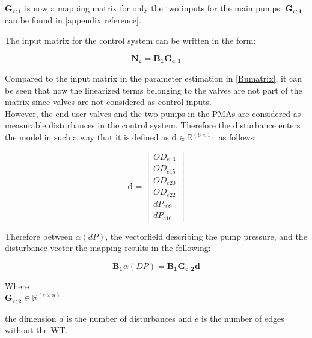 $\pmb{G_{c;1}}$ is now a mapping matrix for only the two inputs for the main pumps. $\pmb{G_{c;1}}$ can be found in [appendix reference].

The input matrix for the control system can be written in the form: 

\begin{equation}
  \pmb{N_c} =  \pmb{B_1}\pmb{G_{c;1}}  
\label{inputmatrix_control}	
\end{equation}

Compared to the input matrix in the parameter estimation in \eqref{Bumatrix}, it can be seen that now the linearized terms belonging to the valves are not part of the matrix since valves are not considered as control inputs. 
\\
However, the end-user valves and the two pumps in the PMAs are considered as measurable disturbances in the control system. Therefore the disturbance enters the model in such a way that it is defined as $\pmb{d} \in \pmb{\mathbb{R}}^{(6 \times 1)}$ as follows: 

\begin{equation}
\pmb{d} =
\begin{bmatrix} 
OD_{e13} \\
OD_{e15} \\
OD_{e20} \\
OD_{e22} \\
dP_{e09} \\
dP_{e16} 
\label{disturbancevector_control}
\end{bmatrix} 
\end{equation}

Therefore between $\alpha(dP)$, the vectorfield describing the pump pressure, and the disturbance vector the mapping results in the following:

\begin{equation}
\pmb{B_1} \alpha(DP) = \pmb{B_1} \pmb{G_{c;2}} \pmb{d}
\label{mapping_PMA}
\end{equation}


\begin{minipage}[t]{0.20\textwidth}
Where\\
\hspace*{8mm} $\pmb{G_{c;2}} \in \pmb{\mathbb{R}}^{(e \times u)} $ 
\end{minipage}
\begin{minipage}[t]{0.68\textwidth}
\vspace*{2mm}
the dimension $d$ is the number of disturbances and $e$ is the number of edges without the WT. 
\end{minipage} 

